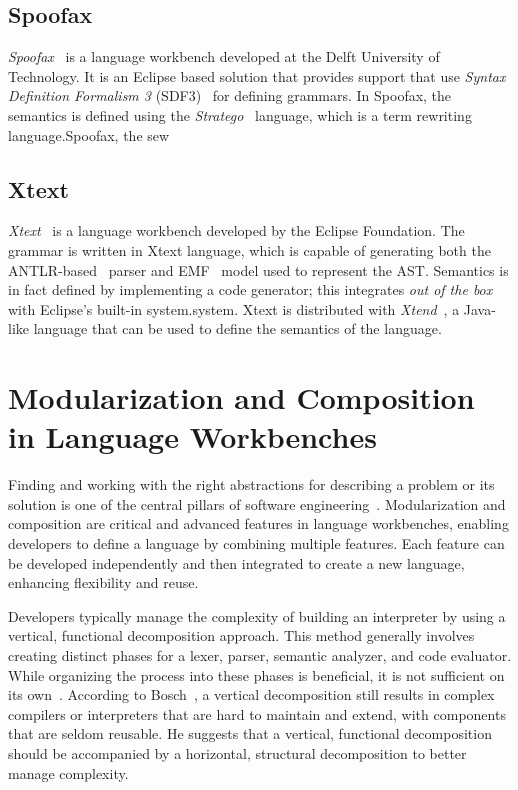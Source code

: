 \subsection{Spoofax}\label{subsec:related-work:spoofax}


\textit{Spoofax}~\cite{Visser10} is a language workbench developed at the Delft University of Technology. It is an Eclipse based solution that provides support that use \textit{Syntax Definition Formalism 3} (SDF3)~\cite{Heering89c} for defining grammars.
In Spoofax, the semantics is defined using the \textit{Stratego}~\cite{Visser01} language, which is a term rewriting language.Spoofax, the sew

\subsection{Xtext}\label{subsec:related-work:xtext}

\textit{Xtext}~\cite{Bettini13b} is a language workbench developed by the Eclipse Foundation. The grammar is written in Xtext language, which is capable of generating both the ANTLR-based~\cite{Parr95} parser and EMF~\cite{Steinberg08} model used to represent the AST.  Semantics is in fact defined by implementing a code generator; this integrates \textit{out of the box} with Eclipse's built-in system.system. Xtext is distributed with \textit{Xtend}~\cite{Bettini13b}, a Java-like language that can be used to define the semantics of the language.

\section{Modularization and Composition in Language Workbenches}\label{sec:related-work:modularization}


Finding and working with the right abstractions for describing a problem or its solution is one of the central pillars of software engineering~\cite{Voelter12}. Modularization and composition are critical and advanced features in language workbenches, enabling developers to define a language by combining multiple features. Each feature can be developed independently and then integrated to create a new language, enhancing flexibility and reuse.

Developers typically manage the complexity of building an interpreter by using a vertical, functional decomposition approach. This method generally involves creating distinct phases for a lexer, parser, semantic analyzer, and code evaluator. While organizing the process into these phases is beneficial, it is not sufficient on its own~\cite{Cazzola16e}. According to Bosch~\cite{Bosch96}, a vertical decomposition still results in complex compilers or interpreters that are hard to maintain and extend, with components that are seldom reusable. He suggests that a vertical, functional decomposition should be accompanied by a horizontal, structural decomposition to better manage complexity.

